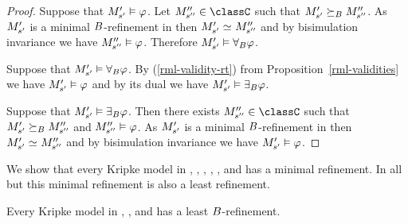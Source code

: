 \begin{proof}
Suppose that ${M^{\prime}_{{s}^{\prime}}} \vDash \varphi$.
Let $\kPModelPP{\kStateSPP} \in \classC$ such that ${M^{\prime}_{{s}^{\prime}}} \succeq_{B} {M^{\prime\prime}_{{s}^{\prime\prime}}}$.
As ${M^{\prime}_{{s}^{\prime}}}$ is a minimal $B$-refinement in \classC{} then $\kPModelP{\kStateSP} \bisimilar \kPModelPP{\kStateSPP}$ and by bisimulation invariance we have ${M^{\prime\prime}_{{s}^{\prime\prime}}} \vDash \varphi$.
Therefore ${M^{\prime}_{{s}^{\prime}}} \vDash {\forall_{B}} \varphi$.

Suppose that ${M^{\prime}_{{s}^{\prime}}} \vDash {\forall_{B}} \varphi$.
By (\ref{rml-validity-rt}) from Proposition~\ref{rml-validities} we have ${M^{\prime}_{{s}^{\prime}}} \vDash \varphi$ and by its dual we have ${M^{\prime}_{{s}^{\prime}}} \vDash {\exists_{B}} \varphi$.

Suppose that ${M^{\prime}_{{s}^{\prime}}} \vDash {\exists_{B}} \varphi$.
Then there exists $\kPModelPP{\kStateSPP} \in \classC$ such that ${M^{\prime}_{{s}^{\prime}}} \succeq_{B} {M^{\prime\prime}_{{s}^{\prime\prime}}}$ and ${M^{\prime\prime}_{{s}^{\prime\prime}}} \vDash \varphi$.
As ${M^{\prime}_{{s}^{\prime}}}$ is a minimal $B$-refinement in \classC{} then $\kPModelP{\kStateSP} \bisimilar \kPModelPP{\kStateSPP}$ and by bisimulation invariance we have ${M^{\prime}_{{s}^{\prime}}} \vDash \varphi$.
\end{proof}

We show that every Kripke model in \classK{}, \classKF{}, \classKFF{}, \classKD{}, \classSF{}, and \classS{} has a minimal refinement.
In all but \classKD{} this minimal refinement is also a least refinement.

\begin{proposition}\label{minimal-refinement-k-k4-k45}
Every Kripke model in \classK{}, \classKF{}, and \classKFF{} has a least $B$-refinement.
\end{proposition}

